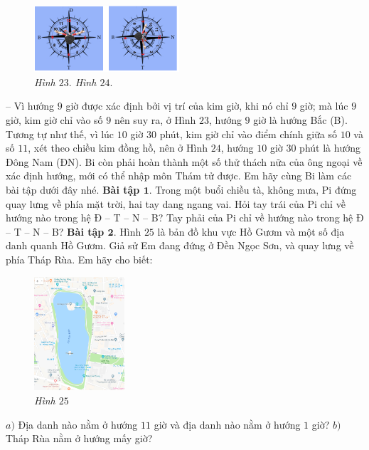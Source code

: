 	\begin{figure}[H]
		\centering
		\vspace*{-5pt}
		\captionsetup{labelformat= empty, justification=centering}
		\includegraphics[width=0.48\textwidth]{pic19}
		\caption{\small\textit{Hình $23.$ \hspace*{80pt} Hình $24.$}}
		\vspace*{-15pt}
	\end{figure}
	-- Vì hướng $9$ giờ được xác định bởi vị trí của kim giờ, khi nó chỉ $9$ giờ; mà lúc $9$ giờ, kim giờ chỉ vào số $9$ nên suy ra, ở Hình $23$, hướng $9$ giờ là hướng Bắc (B). Tương tự như thế, vì lúc $10$ giờ $30$ phút, kim giờ chỉ vào điểm chính giữa số $10$ và số $11$, xét theo chiều kim đồng hồ, nên ở Hình $24$, hướng $10$ giờ $30$ phút là hướng Đông Nam (ĐN).
	\vskip 0.1cm
	Bi còn phải hoàn thành một số thử thách nữa của ông ngoại về xác định hướng, mới có thể nhập môn Thám tử được. Em hãy cùng Bi làm các bài tập dưới đây nhé.
	\vskip 0.1cm
	\textbf{\color{toancuabi}Bài tập $\pmb1.$} Trong một buổi chiều tà, không mưa, Pi đứng quay lưng về phía mặt trời, hai tay dang ngang vai. Hỏi tay trái của Pi chỉ về hướng nào trong hệ Đ -- T -- N -- B? Tay phải của Pi chỉ về hướng nào trong hệ Đ -- T -- N -- B?
	\vskip 0.1cm
	\textbf{\color{toancuabi}Bài tập $\pmb2.$} Hình $25$ là bản đồ khu vực Hồ Gươm và một số địa danh quanh Hồ Gươm. Giả sử Em đang đứng ở Đền Ngọc Sơn, và quay lưng về phía Tháp Rùa. Em hãy cho biết:
	\begin{figure}[H]
		\centering
		\vspace*{-5pt}
		\captionsetup{labelformat= empty, justification=centering}
		\includegraphics[width=0.3\textwidth]{pic25}
		\caption{\small\textit{Hình $25$}}
		\vspace*{-5pt}
	\end{figure}
	$a)$ Địa danh nào nằm ở hướng $11$ giờ và địa danh nào nằm ở hướng $1$ giờ?
	\vskip 0.1cm
	$b)$ Tháp Rùa nằm ở hướng mấy giờ?